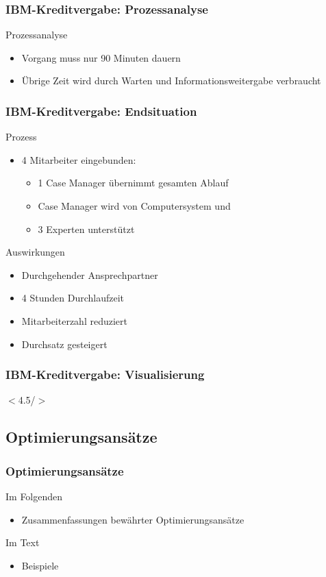 \documentclass{beamer}
\begin{document}
 \begin{frame}
  \frametitle{IBM-Kreditvergabe: Prozessanalyse}
  Prozessanalyse
  \begin{itemize}
    \item Vorgang muss nur 90 Minuten dauern
    \item Übrige Zeit wird durch Warten und Informationsweitergabe verbraucht
  \end{itemize}
 \end{frame}

 \begin{frame}
  \frametitle{IBM-Kreditvergabe: Endsituation}
  Prozess
  \begin{itemize}
    \item 4 Mitarbeiter eingebunden:
    \begin{itemize}
      \item 1 Case Manager übernimmt gesamten Ablauf
      \item Case Manager wird von Computersystem und
      \item 3 Experten unterstützt
    \end{itemize}
  \end{itemize}

  Auswirkungen
  \begin{itemize}
    \item Durchgehender Ansprechpartner
    \item 4 Stunden Durchlaufzeit
    \item Mitarbeiterzahl reduziert
    \item Durchsatz gesteigert
  \end{itemize}
 \end{frame}

 \begin{frame}
  \frametitle{IBM-Kreditvergabe: Visualisierung}
  $<$4.5/$>$
 \end{frame}

 \subsection{Optimierungsansätze}
 \begin{frame}
  \frametitle{Optimierungsansätze}
  Im Folgenden
  \begin{itemize}
    \item Zusammenfassungen bewährter Optimierungsansätze
  \end{itemize}
  Im Text
  \begin{itemize}
    \item Beispiele
  \end{itemize}
 \end{frame}
\end{document}
